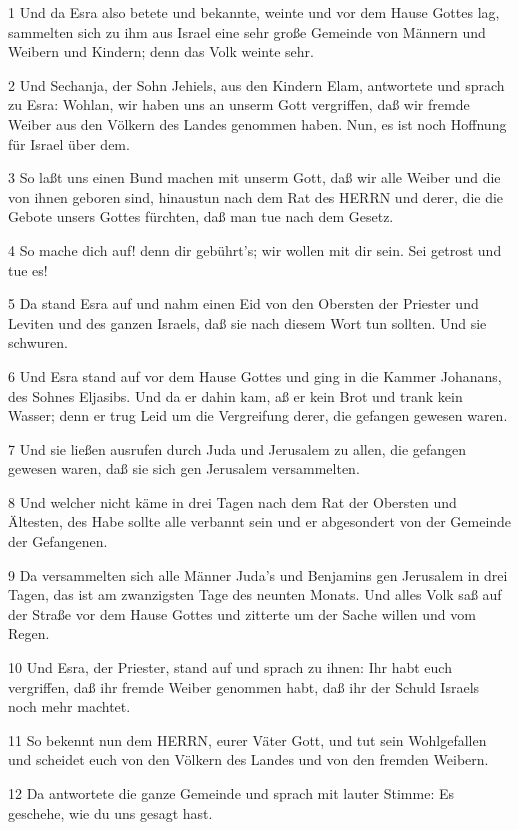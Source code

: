 \par 1 Und da Esra also betete und bekannte, weinte und vor dem Hause Gottes lag, sammelten sich zu ihm aus Israel eine sehr große Gemeinde von Männern und Weibern und Kindern; denn das Volk weinte sehr.
\par 2 Und Sechanja, der Sohn Jehiels, aus den Kindern Elam, antwortete und sprach zu Esra: Wohlan, wir haben uns an unserm Gott vergriffen, daß wir fremde Weiber aus den Völkern des Landes genommen haben. Nun, es ist noch Hoffnung für Israel über dem.
\par 3 So laßt uns einen Bund machen mit unserm Gott, daß wir alle Weiber und die von ihnen geboren sind, hinaustun nach dem Rat des HERRN und derer, die die Gebote unsers Gottes fürchten, daß man tue nach dem Gesetz.
\par 4 So mache dich auf! denn dir gebührt's; wir wollen mit dir sein. Sei getrost und tue es!
\par 5 Da stand Esra auf und nahm einen Eid von den Obersten der Priester und Leviten und des ganzen Israels, daß sie nach diesem Wort tun sollten. Und sie schwuren.
\par 6 Und Esra stand auf vor dem Hause Gottes und ging in die Kammer Johanans, des Sohnes Eljasibs. Und da er dahin kam, aß er kein Brot und trank kein Wasser; denn er trug Leid um die Vergreifung derer, die gefangen gewesen waren.
\par 7 Und sie ließen ausrufen durch Juda und Jerusalem zu allen, die gefangen gewesen waren, daß sie sich gen Jerusalem versammelten.
\par 8 Und welcher nicht käme in drei Tagen nach dem Rat der Obersten und Ältesten, des Habe sollte alle verbannt sein und er abgesondert von der Gemeinde der Gefangenen.
\par 9 Da versammelten sich alle Männer Juda's und Benjamins gen Jerusalem in drei Tagen, das ist am zwanzigsten Tage des neunten Monats. Und alles Volk saß auf der Straße vor dem Hause Gottes und zitterte um der Sache willen und vom Regen.
\par 10 Und Esra, der Priester, stand auf und sprach zu ihnen: Ihr habt euch vergriffen, daß ihr fremde Weiber genommen habt, daß ihr der Schuld Israels noch mehr machtet.
\par 11 So bekennt nun dem HERRN, eurer Väter Gott, und tut sein Wohlgefallen und scheidet euch von den Völkern des Landes und von den fremden Weibern.
\par 12 Da antwortete die ganze Gemeinde und sprach mit lauter Stimme: Es geschehe, wie du uns gesagt hast.
